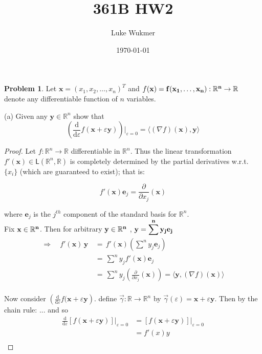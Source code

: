 \documentclass[10pt]{article}
\theoremstyle{plain}
\theoremstyle{definition}
\newtheorem{prob}{Problem}
\providecommand{\R}{\mathbb{R}}%
\numberwithin{equation}{section}
\renewcommand{\epsilon}{\varepsilon}
\begin{document}
\title{\Large{361B HW2}}
\author{Luke Wukmer}
\date{\today} %
\maketitle \normalsize \thispagestyle{empty} %

\begin{prob}
Let $\mathbf{x} = ( x_1, x_2, \dots , x_n )^T$ and $f(\bf{x}) = f(x_1, \dots, x_n) : \R^n \rightarrow \R$ denote any differentiable function of $n$ variables.

(a) Given any $\mathbf{y} \in \R^n$ show that
\[
\left(\frac{\mathrm{d}}{\mathrm{d}\epsilon} f(\mathbf{x} + \epsilon \mathbf{y}) \right)\Big|_{\epsilon=0}  =
\big\langle(\nabla f) (\mathbf{x}) ,  \mathbf{y} \big\rangle
\]

 
\end{prob}

\begin{proof}
	Let $f: \R^n \rightarrow \R $ differentiable in $\R^n$. Thus the linear transformation
	$f' ( \mathbf{x} ) \in \mathsf{L} ( \R^n , \R ) $ is completely determined by the partial derivatives w.r.t. $\{x_i\}$ (which are guaranteed to exist); that is:
	
	\[
	f'(\mathbf{x})\mathbf{e}_j = \frac{\partial}{\partial x_j} (\mathbf{x})
	\]
	
	where $\mathbf{e}_j$ is the $j^{th}$ component of the standard basis for $\R^n$.\\
	
	Fix $\bf{x} \in \R^n$. Then for arbitrary $\bf{y} \in \R^n$ , \quad
	$\bf{y} = \displaystyle  \sum^{n} y_j \bf{e}_j $
	\[
	\begin{aligned}
	\Longrightarrow \quad f'(\mathbf{x}) \, \mathbf{y} \, &= \, f'(\mathbf{x})\left(\sum^{n} y_j \mathbf{e}_j\right)\\
								&= \, \sum^{n} y_j f'(\mathbf{x}) \mathbf{e}_j\\
								&= \, \sum^{n} y_j \left(\frac{\partial}{\partial x_j} (\mathbf{x})\right)
								= \langle \mathbf{y} , (\nabla f) (\mathbf{x}) \rangle \\
	\end{aligned}
	\]
	
	Now consider $\displaystyle \left(\frac{\mathrm{d}}{\mathrm{d}\epsilon} f(\mathbf{x} + \epsilon \mathbf{y}\right)$.
	define $\vec{\gamma} : \R \rightarrow \R^n $ by $\vec{\gamma}(\epsilon) = \mathbf{x} + \epsilon \mathbf{y}.$ Then by the chain rule:
	...
	and so
	\[
	\begin{aligned}
	\frac{\mathrm{d}}{\mathrm{d} \epsilon} \left[ f(\mathbf{x} + \epsilon \mathbf{y}) \right] \big|_{\epsilon=0}
	&= \left[ f(\mathbf{x} + \epsilon \mathbf{y}) \right] \big|_{\epsilon=0} \\
	&= f'(x) y \\
	\end{aligned}
	\]
\end{proof}
\end{document}
